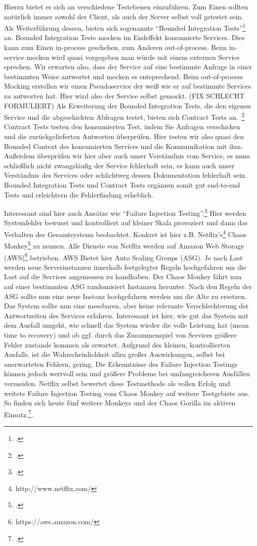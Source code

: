 Hierzu bietet es sich an verschiedene Testebenen einzuführen. Zum Einen sollten natürlich immer sowohl der Client, als auch der Server selbst voll getestet sein. Als Weiterführung dessen, bieten sich sogenannte ``Bounded Integration Tests''\footcite[vgl.][]{rails:soa} an. Bounded Integration Tests mocken im Endeffekt konsumierte Services. Dies kann zum Einen in-process geschehen, zum Anderen out-of-process. Beim in-service mocken wird quasi vorgegeben man würde mit einem externen Service sprechen. Wir erwarten also, dass der Service auf eine bestimmte Anfrage in einer bestimmten Weise antwortet und mocken es entsprechend. Beim out-of-process Mocking erstellen wir einen Pseudoservice der weiß wie er auf bestimmte Services zu antworten hat. Hier wird also der Service selbst gemockt. (FIX SCHLECHT FORMULIERT)
Als Erweiterung der Bounded Integration Tests, die den eigenen Service und die abgeschickten Abfragen testet, bieten sich Contract Tests an.~\footcite[vgl.][]{fowler:contracts} Contract Tests testen den konsumierten Test, indem Sie Anfragen verschicken und die zurückgelieferten Antworten überprüfen. Hier testen wir also quasi den Bounded Context des konsumierten Services und die Kommunikation mit ihm. Außerdem überprüfen wir hier aber auch unser Verständnis vom Service, es muss schließlich nicht zwangsläufig der Service fehlerhaft sein, es kann auch unser Verständnis des Services oder schlichtweg dessen Dokumentation fehlerhaft sein.
Bounded Integration Tests und Contract Tests ergänzen somit gut end-to-end Tests und erleichtern die Fehlerfindung erheblich.

Interessant sind hier auch Ansätze wie ``Failure Injection Testing''.\footcite[][]{netflix:fit} Hier werden Systemfehler bewusst und kontrolliert auf kleiner Skala provoziert und dann das Verhalten des Gesamtsystems beobachtet. Konkret ist hier z.B. Netflix's\footnote{http://www.netflix.com/} Chaos Monkey\footcite[][]{netflix:chaosmonkey} zu nennen. Alle Dienste von Netflix werden auf Amazon Web Storage (AWS)\footnote{https://aws.amazon.com/} betrieben. AWS Bietet hier Auto Scaling Groups (ASG). Je nach Last werden neue Serverinstanzen innerhalb festgelegter Regeln hochgefahren um die Last auf die Services angemessen zu handhaben. Der Chaos Monkey fährt nun auf einer bestimmten ASG randomisiert Instanzen herunter. Nach den Regeln der ASG sollte nun eine neue Instanz hochgefahren werden um die Alte zu ersetzen. Das System sollte nun eine messbaren, aber keine relevante Verschlechterung der Antwortzeiten des Services erfahren. Interessant ist hier, wie gut das System mit dem Ausfall umgeht, wie schnell das System wieder die volle Leistung hat (mean time to recovery) und ob ggf. durch das Zusammenspiel von Services größere Fehler zustande kommen als erwartet. Aufgrund des kleinen, kontrollierten Ausfalls, ist die Wahrscheinlichkeit allzu großer Auswirkungen, selbst bei unerwarteten Fehlern, gering. Die Erkenntnisse des Failure Injection Testings können jedoch wertvoll sein und größere Probleme bei umfangreicheren Ausfällen vermeiden. Netflix selbst bewertet diese Testmethode als vollen Erfolg und weitete Failure Injection Testing vom Chaos Monkey auf weitere Testgebiete aus. So finden sich heute fünf weitere Monkeys und der Chaos Gorilla im aktiven Einsatz.\footcite[][]{netflix:army}.

